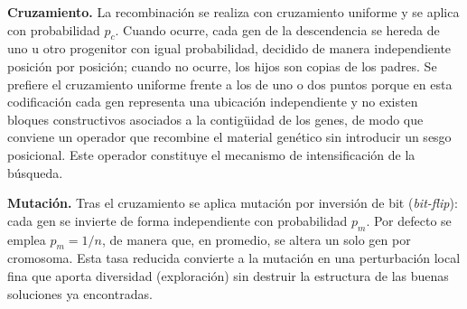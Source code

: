 \documentclass[letter, 10pt]{article}
\begin{document}
\textbf{Cruzamiento.} La recombinación se realiza con cruzamiento uniforme y se aplica con
probabilidad $p_c$. Cuando ocurre, cada gen de la descendencia se hereda de uno u otro progenitor
con igual probabilidad, decidido de manera independiente posición por posición; cuando no ocurre,
los hijos son copias de los padres. Se prefiere el cruzamiento uniforme frente a los de uno o dos
puntos porque en esta codificación cada gen representa una ubicación independiente y no existen
bloques constructivos asociados a la contigüidad de los genes, de modo que conviene un operador
que recombine el material genético sin introducir un sesgo posicional. Este operador constituye el
mecanismo de intensificación de la búsqueda.

\textbf{Mutación.} Tras el cruzamiento se aplica mutación por inversión de bit (\emph{bit-flip}):
cada gen se invierte de forma independiente con probabilidad $p_m$. Por defecto se emplea
$p_m = 1/n$, de manera que, en promedio, se altera un solo gen por cromosoma. Esta tasa reducida
convierte a la mutación en una perturbación local fina que aporta diversidad (exploración) sin
destruir la estructura de las buenas soluciones ya encontradas.
\end{document}
